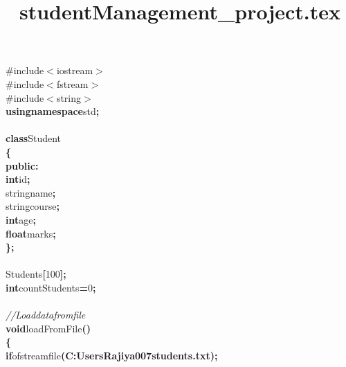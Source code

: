 \documentclass[a4paper, 10pt]{article}
\title{studentManagement_project.tex}
\newcommand\SPC{\hspace*{0.6em}}
\newcommand\BS{\mbox{\char 92}}
\newcommand\QOT{\mbox{\char 34}}
\newcommand{\CppAComment}[1]{\textit{\textcolor[rgb]{0,0.47,0.84}{#1}}}
\newcommand{\CppAIdentifier}[1]{#1}
\newcommand{\CppANumber}[1]{\textcolor[rgb]{0.5,0,0.5}{#1}}
\newcommand{\CppAPreprocessor}[1]{\textcolor[rgb]{0,0.5,0}{#1}}
\newcommand{\CppAReservedWord}[1]{\textbf{#1}}
\newcommand{\CppASpace}[1]{\colorbox[rgb]{1,1,1}{#1}}
\newcommand{\CppAString}[1]{\textbf{\textcolor[rgb]{0,0,1}{#1}}}
\newcommand{\CppASymbol}[1]{\textbf{\textcolor[rgb]{1,0,0}{#1}}}
\begin{document}
\begin{ttfamily}
\noindent
\CppAPreprocessor{\#include\SPC $<$iostream$>$}\\
\CppAPreprocessor{\#include\SPC $<$fstream$>$}\\
\CppAPreprocessor{\#include\SPC $<$string$>$}\\
\CppAReservedWord{using}\CppASpace{\SPC }\CppAReservedWord{namespace}\CppASpace{\SPC }\CppAIdentifier{std}\CppASymbol{;}\\
\\
\CppAReservedWord{class}\CppASpace{\SPC }\CppAIdentifier{Student}\\
\CppASymbol{\{}\\
\CppAReservedWord{public}\CppASymbol{:}\\
\CppASpace{\SPC \SPC \SPC \SPC }\CppAReservedWord{int}\CppASpace{\SPC }\CppAIdentifier{id}\CppASymbol{;}\\
\CppASpace{\SPC \SPC \SPC \SPC }\CppAIdentifier{string}\CppASpace{\SPC }\CppAIdentifier{name}\CppASymbol{;}\\
\CppASpace{\SPC \SPC \SPC \SPC }\CppAIdentifier{string}\CppASpace{\SPC }\CppAIdentifier{course}\CppASymbol{;}\\
\CppASpace{\SPC \SPC \SPC \SPC }\CppAReservedWord{int}\CppASpace{\SPC }\CppAIdentifier{age}\CppASymbol{;}\\
\CppASpace{\SPC \SPC \SPC \SPC }\CppAReservedWord{float}\CppASpace{\SPC }\CppAIdentifier{marks}\CppASymbol{;}\\
\CppASymbol{\}}\CppASymbol{;}\\
\\
\CppAIdentifier{Student}\CppASpace{\SPC }\CppAIdentifier{s}\CppASymbol{[}\CppANumber{100}\CppASymbol{]}\CppASymbol{;}\\
\CppAReservedWord{int}\CppASpace{\SPC }\CppAIdentifier{countStudents}\CppASpace{\SPC }\CppASymbol{=}\CppASpace{\SPC }\CppANumber{0}\CppASymbol{;}\\
\\
\CppAComment{//\SPC Load\SPC data\SPC from\SPC file}\\
\CppAReservedWord{void}\CppASpace{\SPC }\CppAIdentifier{loadFromFile}\CppASymbol{(}\CppASymbol{)}\\
\CppASymbol{\{}\\
\CppASpace{\SPC \SPC \SPC \SPC }\CppAReservedWord{if}\CppASpace{\SPC }\CppAIdentifier{ofstream}\CppASpace{\SPC }\CppAIdentifier{file}\CppASymbol{(}\CppAString{\QOT C:\BS \BS Users\BS \BS Rajiya007\BS \BS students.txt\QOT }\CppASymbol{)}\CppASymbol{;}\CppASpace{\SPC }\\

\end{ttfamily}
\end{document}
